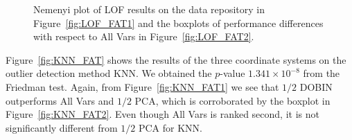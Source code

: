 \documentclass[a4paper,12pt]{article}
\begin{document}
\begin{figure}[!ht]
	\centering
	\hfill
	\caption{Nemenyi plot of LOF results on the data repository in Figure~\ref{fig:LOF_FAT1} and the boxplots of performance differences with respect to All Vars in Figure~\ref{fig:LOF_FAT2}.}
	\label{fig:LOF_FAT}
\end{figure}

Figure~\ref{fig:KNN_FAT} shows the results of the three coordinate systems on the outlier detection method KNN. We obtained the $p$-value $1.341\times 10^{-8}$ from the Friedman test. Again, from Figure~\ref{fig:KNN_FAT1} we see that $1/2$ DOBIN outperforms All Vars and $1/2$ PCA, which is corroborated by the boxplot in Figure~\ref{fig:KNN_FAT2}. Even though All Vars is ranked second, it is not significantly different from $1/2$ PCA for KNN.
\end{document}
